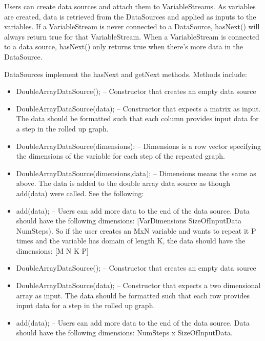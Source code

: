 
Users can create data sources and attach them to VariableStreams.  As variables are created, data is retrieved from the DataSources and applied as inputs to the variables.  If a VariableStream is never connected to a DataSource, hasNext() will always return true for that VariableStream.  When a VariableStream is connected to a data source, hasNext() only returns true when there's more data in the DataSource.

DataSources implement the hasNext and getNext methods.  Methods include:

\ifmatlab
\begin{itemize}
\item DoubleArrayDataSource(); -- Constructor that creates an empty data source
\item DoubleArrayDataSource(data); -- Constructor that expects a matrix as input.  The data should be formatted such that each column provides input data for a step in the rolled up graph.
\item DoubleArrayDataSource(dimensions); -- Dimensions is a row vector specifying the dimensions of the variable for each step of the repeated graph.
\item DoubleArrayDataSource(dimensions,data); -- Dimensions means the same as above.  The data is added to the double array data source as though add(data) were called.  See the following:
\item add(data); -- Users can add  more data to the end of the data source.  Data should have the following dimensions: [VarDimensions SizeOfInputData NumSteps).  So if the user creates an MxN variable and wants to repeat it P times and the variable has domain of length K, the data should have the dimensions: [M N K P]
\end{itemize}
\fi

\ifjava
\begin{itemize}
\item DoubleArrayDataSource(); -- Constructor that creates an empty data source
\item DoubleArrayDataSource(data); -- Constructor that expects a two dimensional array as input.  The data should be formatted such that each row provides input data for a step in the rolled up graph.
\item add(data); -- Users can add  more data to the end of the data source.  Data should have the following dimensions: NumSteps x SizeOfInputData.
\end{itemize}
\fi

